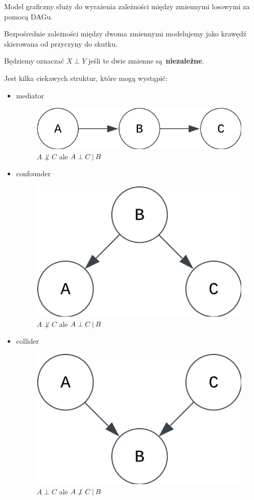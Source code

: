 Model graficzny służy do wyrażenia zależności między zmiennymi losowymi za pomocą DAGu.

Bezpośrednie zależności między dwoma zmiennymi modelujemy jako krawędź skierowana od przyczyny do skutku.

Będziemy oznaczać \( X \perp Y \) jeśli te dwie zmienne są \textbf{niezależne}.

Jest kilka ciekawych struktur, które mogą wystąpić:
\begin{itemize}
	\item mediator
	      \begin{figure}[H]
		      \centering
		      \includegraphics{chapters/graphical models/img/mediator.png}
		      \caption{\( A \not \perp C \) ale \( A \perp C \:\vert\: B \)}
	      \end{figure}

	\item confounder

	      \begin{figure}[H]
		      \centering
		      \includegraphics{chapters/graphical models/img/confounder.png}
		      \caption{\( A \not \perp C \) ale \( A \perp C \:\vert\: B \) }
	      \end{figure}

	\item collider
	      \begin{figure}[H]
		      \centering
		      \includegraphics{chapters/graphical models/img/collider.png}
		      \caption{\( A \perp C \) ale \( A \not \perp C \:\vert\: B \) }
	      \end{figure}
\end{itemize}
